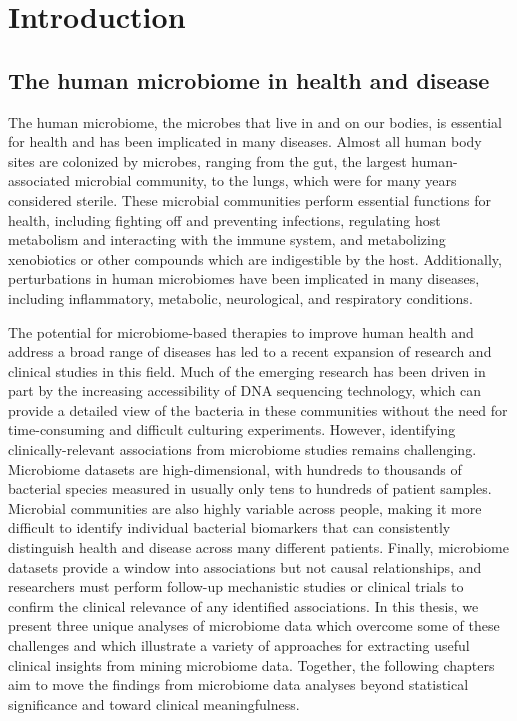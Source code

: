 
\chapter{Introduction}

\section{The human microbiome in health and disease}

The human microbiome, the microbes that live in and on our bodies, is essential for health and has been implicated in many diseases.
Almost all human body sites are colonized by microbes, ranging from the gut, the largest human-associated microbial community, to the lungs, which were for many years considered sterile.
These microbial communities perform essential functions for health, including fighting off and preventing infections, regulating host metabolism and interacting with the immune system, and metabolizing xenobiotics or other compounds which are indigestible by the host.
Additionally, perturbations in human microbiomes have been implicated in many diseases, including inflammatory, metabolic, neurological, and respiratory conditions.

The potential for microbiome-based therapies to improve human health and address a broad range of diseases has led to a recent expansion of research and clinical studies in this field.
Much of the emerging research has been driven in part by the increasing accessibility of DNA sequencing technology, which can provide a detailed view of the bacteria in these communities without the need for time-consuming and difficult culturing experiments.
However, identifying clinically-relevant associations from microbiome studies remains challenging.
Microbiome datasets are high-dimensional, with hundreds to thousands of bacterial species measured in usually only tens to hundreds of patient samples.
Microbial communities are also highly variable across people, making it more difficult to identify individual bacterial biomarkers that can consistently distinguish health and disease across many different patients.
Finally, microbiome datasets provide a window into associations but not causal relationships, and researchers must perform follow-up mechanistic studies or clinical trials to confirm the clinical relevance of any identified associations.
In this thesis, we present three unique analyses of microbiome data which overcome some of these challenges and which illustrate a variety of approaches for extracting useful clinical insights from mining microbiome data.
Together, the following chapters aim to move the findings from microbiome data analyses beyond statistical significance and toward clinical meaningfulness.

